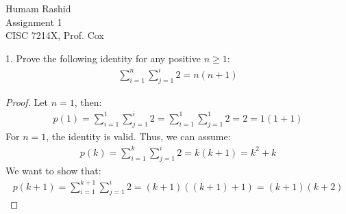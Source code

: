 \documentclass{scrartcl}
\begin{document}
\begin{flushleft}

    Humam Rashid\\
    Assignment 1\\
    CISC 7214X, Prof. Cox\\
    \bigskip
    
    1. Prove the following identity for any positive $n \geq 1$:
    \begin{align*}
        \sum_{i=1}^{n}\sum_{j=1}^{i} 2 = n (n + 1)
    \end{align*}

    \begin{proof}
        Let $n = 1$, then:
        \begin{align}
            p(1) = \sum_{i=1}^{1}\sum_{j=1}^{i} 2 = \sum_{i=1}^{1}\sum_{j=1}^{1} 2 = 2 = 1 (1 + 1)
        \end{align}
        For $n = 1$, the identity is valid. Thus, we can assume:
        \begin{align}
            p(k) = \sum_{i=1}^{k}\sum_{j=1}^{i} 2 = k (k + 1) = k^2 + k
        \end{align}
        We want to show that:
        \begin{align}
            p(k + 1) = \sum_{i=1}^{k + 1}\sum_{j=1}^{i} 2 = (k + 1) ((k + 1) + 1) = (k + 1) (k + 2)
        \end{align}
    \end{proof}

\end{flushleft}
\end{document}
